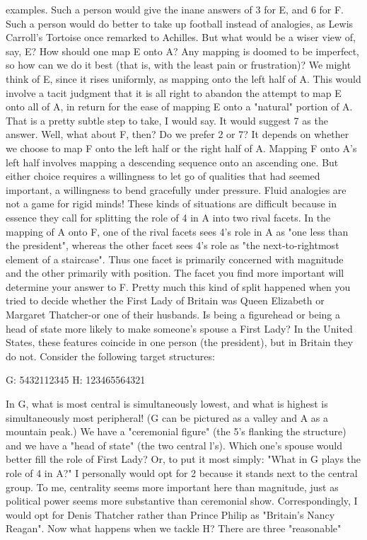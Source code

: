 examples. Such a person would give the inane answers of 3 for E, and 6 for F. Such a
person would do better to take up football instead of analogies, as Lewis Carroll's
Tortoise once remarked to Achilles.
        But what would be a wiser view of, say, E? How should one map E onto A?
Any mapping is doomed to be imperfect, so how can we do it best (that is, with the
least pain or frustration)? We might think of E, since it rises uniformly, as mapping
onto the left half of A. This would involve a tacit judgment that it is all right to
abandon the attempt to map E onto all of A, in return for the ease of mapping E onto a
"natural" portion of A. That is a pretty subtle step to take, I would say. It would
suggest 7 as the answer.
        Well, what about F, then? Do we prefer 2 or 7? It depends on whether we
choose to map F onto the left half or the right half of A. Mapping F onto A's left half
involves mapping a descending sequence onto an ascending one. But either choice
requires a willingness to let go of qualities that had seemed important, a willingness to
bend gracefully under pressure. Fluid analogies are not a game for rigid minds!
        These kinds of situations are difficult because in essence they call for splitting
the role of 4 in A into two rival facets. In the mapping of A onto F, one of the rival
facets sees 4's role in A as "one less than the president", whereas the other facet sees
4's role as "the next-to-rightmost element of a staircase". Thus one facet is primarily
concerned with magnitude and the other primarily with position. The facet you find
more important will determine your answer to F.
        Pretty much this kind of split happened when you tried to decide whether the
First Lady of Britain was Queen Elizabeth or Margaret Thatcher-or one of their
husbands. Is being a figurehead or being a head of state more likely to make
someone's spouse a First Lady? In the United States, these features coincide in one
person (the president), but in Britain they do not. Consider the following target
structures:

               G: 5432112345
               H: 123465564321

In G, what is most central is simultaneously lowest, and what is highest is
simultaneously most peripheral! (G can be pictured as a valley and A as a mountain
peak.) We have a "ceremonial figure" (the 5's flanking the structure) and we have a
"head of state" (the two central l's). Which one's spouse would better fill the role of
First Lady? Or, to put it most simply: "What in G plays the role of 4 in A?" I
personally would opt for 2 because it stands next to the central group. To me,
centrality seems more important here than magnitude, just as political power seems
more substantive than ceremonial show. Correspondingly, I would opt for Denis
Thatcher rather than Prince Philip as "Britain's Nancy Reagan".
        Now what happens when we tackle H? There are three "reasonable"




